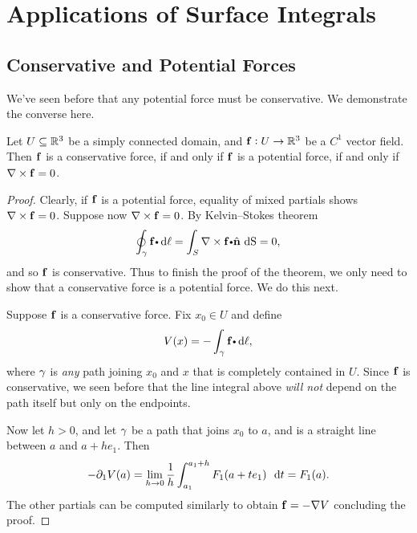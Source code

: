 \section{Applications of Surface Integrals}
\subsection{Conservative and Potential Forces } \label{conservative-potencial}






  We've seen before that any potential force must be conservative.
  We demonstrate  the converse here.

  \begin{theorem}\label{thmPotentialForce}
    Let $U \subseteq \mathbb{R}^3$ be a simply connected domain, and $\mathbf{ f}:U \to \mathbb{R}^3$ be a $C^1$ vector field.
    Then $\mathbf{ f}$ is a conservative force, if and only if $\mathbf{ f}$ is a potential force, if and only if $\nabla \times \mathbf{ f} = 0$.
  \end{theorem}


  \begin{proof}
    Clearly, if $\mathbf{ f}$ is a potential force, equality of mixed partials shows $\nabla \times \mathbf{ f} = 0$.
    Suppose now $\nabla \times \mathbf{ f} = 0$.
    By Kelvin–Stokes theorem
    \begin{equation*}
      \doint_\caminho \funvect{f} \bp \d\ell = \dint_{\superficie} \curlb \funvect{f} \bp \hat{ \vector{n}} \,   \d \S= 0,
    \end{equation*}
    and so $\mathbf{ f}$ is conservative.
    Thus to finish the proof of the theorem, we only need to show that a conservative force is a potential force.
    We do this next.

    Suppose $\mathbf{ f}$ is a conservative force.
    Fix $x_0 \in U$ and define
    \begin{equation*}
      V(x) = -\dint_\caminho \funvect{f} \bp \d\ell,
    \end{equation*}
    where $\gamma$ is \emph{any} path joining $x_0$ and $x$ that is completely contained in $U$.
    Since $\mathbf{ f}$ is conservative, we seen before that the line integral above \emph{will not} depend on the path itself but only on the endpoints.

    Now let $h > 0$, and let $\gamma$ be a path that joins $x_0$ to $a$, and is a straight line between $a$ and $a + h e_1$.
    Then
    \begin{equation*}
      -\partial_1 V(a) = \lim_{h \to 0} \dfrac{1}{h} \dint_{a_1}^{a_1 + h} F_1( a + t e_1) \, \dt= F_1(a).
    \end{equation*}
    The other partials can be computed similarly to obtain $\mathbf{ f} = -\nabla V$ concluding the proof.
  \end{proof}

